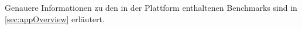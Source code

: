 
Genauere Informationen zu den in der Plattform enthaltenen Benchmarks sind in \cref{sec:appOverview} erläutert.
